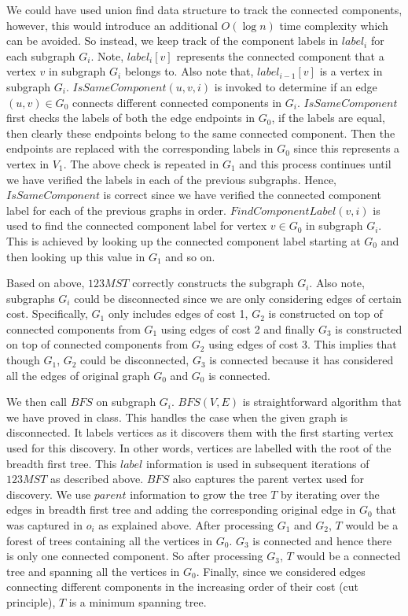 \documentclass{article}
\begin{document}
    We could have used union find data structure to track the connected components, however, this would introduce an additional $O(\log n)$ time complexity which can be avoided. So instead, we keep track of the component labels in $label_i$ for each subgraph $G_i$. Note, $label_i[v]$ represents the connected component that a vertex $v$ in subgraph $G_i$ belongs to. Also note that, $label_{i-1}[v]$ is a vertex in subgraph $G_i$. $IsSameComponent(u, v, i)$ is invoked to determine if an edge $(u, v) \in G_0$ connects different connected components in $G_i$. $IsSameComponent$ first checks the labels of both the edge endpoints in $G_0$, if the labels are equal, then clearly these endpoints belong to the same connected component. Then the endpoints are replaced with the corresponding labels in $G_0$ since this represents a vertex in $V_1$. The above check is repeated in $G_1$ and this process continues until we have verified the labels in each of the previous subgraphs. Hence, $IsSameComponent$ is correct since we have verified the connected component label for each of the previous graphs in order. $FindComponentLabel(v, i)$ is used to find the connected component label for vertex $v \in G_0$ in subgraph $G_i$. This is achieved by looking up the connected component label starting at $G_0$ and then looking up this value in $G_1$ and so on.

    Based on above, $123MST$ correctly constructs the subgraph $G_i$. Also note, subgraphs $G_i$ could be disconnected since we are only considering edges of certain cost. Specifically, $G_1$ only includes edges of cost 1, $G_2$ is constructed on top of connected components from $G_1$ using edges of cost 2 and finally $G_3$ is constructed on top of connected components from $G_2$ using edges of cost 3. This implies that though $G_1$, $G_2$ could be disconnected, $G_3$ is connected because it has considered all the edges of original graph $G_0$ and $G_0$ is connected.
    
    We then call $BFS$ on subgraph $G_i$. $BFS(V, E)$ is straightforward algorithm that we have proved in class. This handles the case when the given graph is disconnected. It labels vertices as it discovers them with the first starting vertex used for this discovery. In other words, vertices are labelled with the root of the breadth first tree. This $label$ information is used in subsequent iterations of $123MST$ as described above. $BFS$ also captures the parent vertex used for discovery. We use $parent$ information to grow the tree $T$ by iterating over the edges in breadth first tree and adding the corresponding original edge in $G_0$ that was captured in $o_i$ as explained above. After processing $G_1$ and $G_2$, $T$ would be a forest of trees containing all the vertices in $G_0$. $G_3$ is connected and hence there is only one connected component. So after processing $G_3$, $T$ would be a connected tree and spanning all the vertices in $G_0$. Finally, since we considered edges connecting different components in the increasing order of their cost (cut principle), $T$ is a minimum spanning tree.
\end{document}
